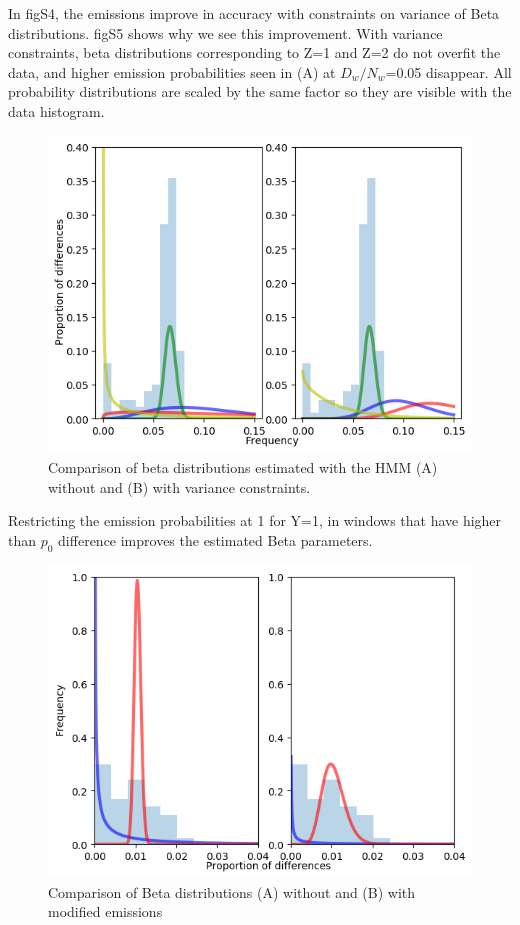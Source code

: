 \documentclass[12pt, letterpaper]{article}
\begin{document}
In figS4, the emissions improve in accuracy with constraints on variance of Beta distributions. figS5 shows why we see this improvement. With variance constraints, beta distributions corresponding to Z=1 and Z=2 do not overfit the data, and higher emission probabilities seen in (A) at $D_w/N_w$=0.05 disappear. All probability distributions are scaled by the same factor so they are visible with the data histogram.
\begin{figure}[htp]
    \centering
    \includegraphics[width=18cm]{supplementary_info/plots/contam0_inbred1_run57_coverage0.2_asc0_inputMode_hapProbs_fil0_pair0_15_relid_betaplot.png}
    \caption{Comparison of beta distributions estimated with the HMM (A) without and (B) with variance constraints.}
    \label{figS3}
\end{figure}

Restricting the emission probabilities at 1 for Y=1, in windows that have higher than $p_0$ difference improves the estimated Beta parameters. 
\begin{figure}[htp]
    \centering
    \includegraphics[width=18cm]{supplementary_info/plots/contam0_inbred1_run57_coverage0.2_asc0_inputMode_hapProbs_fil0_ind0_foreced_roh.png}
    \caption{Comparison of Beta distributions (A) without and (B) with modified emissions}
    \label{figS3}
\end{figure}
\end{document}
